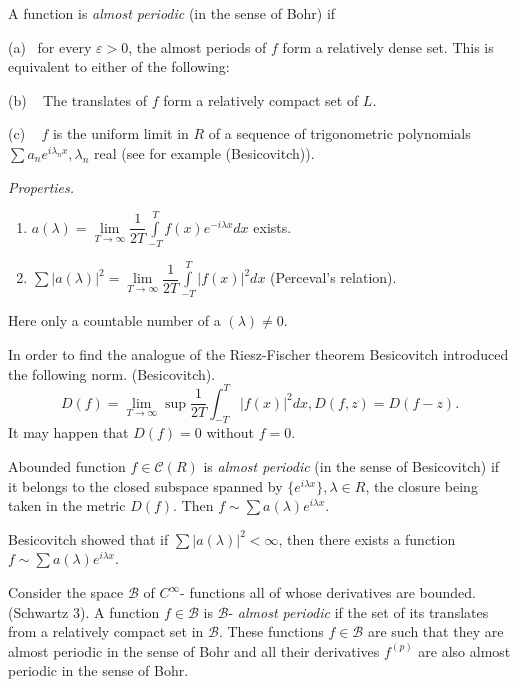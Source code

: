A function is \textit{almost periodic} (in the sense of Bohr) if 

(a)~ for every $\varepsilon > 0$, the almost periods of $f$ form a
relatively dense set. This is equivalent to either of the following: 

(b) ~ The translates of $f$ form a relatively compact set of $L$.

(c) ~ $f$ is the uniform limit in $R$ of a sequence of trigonometric
polynomials $\sum a_n e^{i \lambda_n x}, \lambda_n$ real (see for
example (Besicovitch)). 
 
 \medskip
 \noindent
 \textit{Properties.}
\begin{enumerate}[(1)]
\item $a(\lambda ) = \lim\limits_{T \to \infty}
 \dfrac{1}{2T}\int\limits_{-T}^{T} f(x) e^{-i \lambda x} dx$ exists. 
\item $\sum \Big| a(\lambda) \Big|^2 = \lim\limits_{T \to
 \infty}\dfrac{1}{2T}\int\limits_{-T}^{T}\Big| f(x) \Big|^2 dx$
 (Perceval's relation). 
\end{enumerate} 
 
 Here only a countable number of a $(\lambda )\neq 0$.
 
 In order to find the analogue of the Riesz-Fischer theorem Besicovitch
 introduced the following norm. (Besicovitch). 
 $$
 D(f)=\lim\limits_{T \to \infty} \sup\dfrac{1}{2T}\int_{-T}^T|f(x)|^2 dx, D(f, z)=D(f-z).
 $$
 It may happen that $D(f)=0$ without $f=0$.
 
\begin{defi*}[of Besicovitch] 
  A\pageoriginale  bounded function $f \in
 \mathscr{C} (R)$ is \textit{almost periodic} (in the sense of
 Besicovitch) if it belongs to the closed subspace spanned by $\{e^{i
 \lambda x}\}, \lambda \in R$, the closure being taken in the metric
 $D(f)$. Then $f \sim \sum a(\lambda) e^{i \lambda x}$. 
\end{defi*}

 Besicovitch showed that if $\sum \big | a (\lambda) \big |^2 <
 \infty$, then there exists a function $f \sim \sum a (\lambda) e^{i
 \lambda x}$. 
 
\begin{defi*}[of Schwartz] 
  Consider the space $\mathscr{B}$ of
  $C^\infty$- functions all of whose derivatives are bounded. (Schwartz
  $3$). A function $f \in \mathscr{B}$ is $\mathscr{B}$- \textit{almost
    periodic} if the set of its translates from a relatively compact set
  in $\mathscr{B}$. These functions $f \in \mathscr{B}$ are such that
  they are almost periodic in the sense of Bohr and all their
  derivatives $f^{(p)}$ are also almost periodic in the sense of Bohr. 
\end{defi*}

